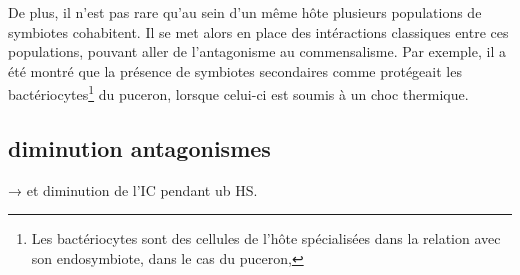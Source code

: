 De plus, il n'est pas rare qu'au sein d'un même hôte plusieurs populations de symbiotes
cohabitent. Il se met alors en place des intéractions classiques entre ces
populations, pouvant aller de l'antagonisme au commensalisme. Par exemple, il
a été montré \cite{montllor2002} que la présence de symbiotes secondaires
comme  protégeait les bactériocytes\footnote{Les
bactériocytes sont des cellules de l'hôte spécialisées dans la relation avec
son endosymbiote, dans le cas du puceron, } du puceron,
lorsque celui-ci est soumis à un choc thermique.

\subsection{diminution antagonismes} %
\label{sub:diminution_antagonismes}

→  et diminution de l'IC pendant ub HS.

